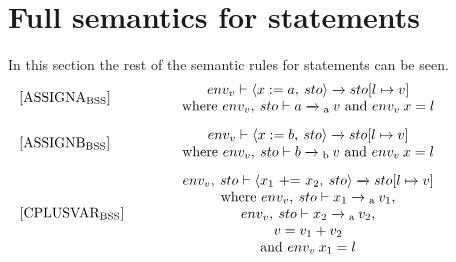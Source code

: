 \section{Full semantics for statements}\label{AppSec:SemanticsStatements}
In this section the rest of the semantic rules for statements can be seen.
\begin{equation}
\begin{minipage}{.2\linewidth}
$[\text{ASSIGNA}_\text{BSS}]$
\end{minipage}
\begin{minipage}{.8\linewidth}
\centering
$env_v \vdash \langle x := a, \: sto \rangle \xrightarrow{} sto[l \mapsto v]$
\\
where $env_v, \: sto \vdash a \xrightarrow{}\textsubscript{a} \: v$ and $env_v \: x = l$
\end{minipage}
\end{equation}

\begin{equation}
\begin{minipage}{.2\linewidth}
$[\text{ASSIGNB}_\text{BSS}]$
\end{minipage}
\begin{minipage}{.8\linewidth}
\centering
$env_v \vdash \langle x := b, \: sto \rangle \xrightarrow{} sto[l \mapsto v]$
\\
where $env_v, \: sto \vdash b \xrightarrow{}\textsubscript{b} \: v$ and $env_v \: x = l$
\end{minipage}
\end{equation}

\begin{equation}
\begin{minipage}{.2\linewidth}
$[\text{CPLUSVAR}_\text{BSS}]$
\end{minipage}
\begin{minipage}{.8\linewidth}
\centering
$env_v, \: sto \vdash \langle x_1 \text{ += } x_2, \: sto \rangle \xrightarrow{} sto[l \mapsto v]$
\\
where $env_v, \: sto \vdash x_1 \xrightarrow{}\textsubscript{a} \: v_1$,
\\
$env_v, \: sto \vdash x_2 \xrightarrow{}\textsubscript{a} \: v_2$,
\\
$v = v_1 + v_2$
\\
and $env_v  \: x_1 = l$
\end{minipage}
\end{equation}

